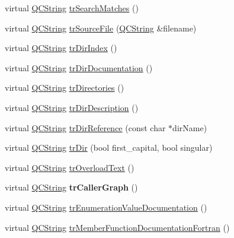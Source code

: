 \begin{DoxyCompactItemize}
\item 
virtual \mbox{\hyperlink{class_q_c_string}{Q\+C\+String}} \mbox{\hyperlink{class_translator_czech_ae7016606545b5c6ca5437aa4fd1c87f5}{tr\+Search\+Matches}} ()
\item 
virtual \mbox{\hyperlink{class_q_c_string}{Q\+C\+String}} \mbox{\hyperlink{class_translator_czech_a06a0c380cbb43d799fa553f4838b45ee}{tr\+Source\+File}} (\mbox{\hyperlink{class_q_c_string}{Q\+C\+String}} \&filename)
\item 
virtual \mbox{\hyperlink{class_q_c_string}{Q\+C\+String}} \mbox{\hyperlink{class_translator_czech_ab1ba980534dfebb0e523a7a36f0a5489}{tr\+Dir\+Index}} ()
\item 
virtual \mbox{\hyperlink{class_q_c_string}{Q\+C\+String}} \mbox{\hyperlink{class_translator_czech_a4469309f5c391636ecfe608d1680774d}{tr\+Dir\+Documentation}} ()
\item 
virtual \mbox{\hyperlink{class_q_c_string}{Q\+C\+String}} \mbox{\hyperlink{class_translator_czech_a5a70049ad39f783d34fdff2e6a289d40}{tr\+Directories}} ()
\item 
virtual \mbox{\hyperlink{class_q_c_string}{Q\+C\+String}} \mbox{\hyperlink{class_translator_czech_afee6a3bd8f2562a1e1c30fd668bf6255}{tr\+Dir\+Description}} ()
\item 
virtual \mbox{\hyperlink{class_q_c_string}{Q\+C\+String}} \mbox{\hyperlink{class_translator_czech_a749cbb6588827df5eaf78e857142d6b3}{tr\+Dir\+Reference}} (const char $\ast$dir\+Name)
\item 
virtual \mbox{\hyperlink{class_q_c_string}{Q\+C\+String}} \mbox{\hyperlink{class_translator_czech_ae31ae6026b12ff3423988ec06d2ba997}{tr\+Dir}} (bool first\+\_\+capital, bool singular)
\item 
virtual \mbox{\hyperlink{class_q_c_string}{Q\+C\+String}} \mbox{\hyperlink{class_translator_czech_adfb2800acfda8d8c258efd75b5bc7721}{tr\+Overload\+Text}} ()
\item 
\mbox{\label{class_translator_czech_a2277c8495360bda093341137b440e23c}} 
virtual \mbox{\hyperlink{class_q_c_string}{Q\+C\+String}} {\bfseries tr\+Caller\+Graph} ()
\item 
virtual \mbox{\hyperlink{class_q_c_string}{Q\+C\+String}} \mbox{\hyperlink{class_translator_czech_a8b90e598df424c126b7413fe33134ec8}{tr\+Enumeration\+Value\+Documentation}} ()
\item 
virtual \mbox{\hyperlink{class_q_c_string}{Q\+C\+String}} \mbox{\hyperlink{class_translator_czech_ae1c9fbd277a3a3f61bbb2c953fe86585}{tr\+Member\+Function\+Documentation\+Fortran}} ()

\end{DoxyCompactItemize}

